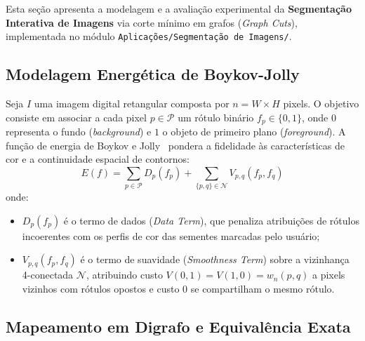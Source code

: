 \documentclass[12pt,a4paper]{article}
\begin{document}
Esta seção apresenta a modelagem e a avaliação experimental da \textbf{Segmentação Interativa de Imagens} via corte mínimo em grafos (\textit{Graph Cuts}), implementada no módulo \texttt{Aplicações/Segmentação de Imagens/}.

\subsection{Modelagem Energética de Boykov-Jolly}

Seja $I$ uma imagem digital retangular composta por $n = W \times H$ pixels. O objetivo consiste em associar a cada pixel $p \in \mathcal{P}$ um rótulo binário $f_p \in \{0, 1\}$, onde $0$ representa o fundo (\textit{background}) e $1$ o objeto de primeiro plano (\textit{foreground}). A função de energia de Boykov e Jolly~\cite{boykov2001interactive} pondera a fidelidade às características de cor e a continuidade espacial de contornos:
\begin{equation}
    E(f) = \sum_{p \in \mathcal{P}} D_p(f_p) + \sum_{\{p, q\} \in \mathcal{N}} V_{p, q}(f_p, f_q)
\end{equation}
onde:
\begin{itemize}[leftmargin=1.5em, itemsep=0.15em, topsep=0.2em, parsep=0em]
    \item $D_p(f_p)$ é o termo de dados (\textit{Data Term}), que penaliza atribuições de rótulos incoerentes com os perfis de cor das sementes marcadas pelo usuário;
    \item $V_{p, q}(f_p, f_q)$ é o termo de suavidade (\textit{Smoothness Term}) sobre a vizinhança 4-conectada $\mathcal{N}$, atribuindo custo $V(0, 1) = V(1, 0) = w_n(p, q)$ a pixels vizinhos com rótulos opostos e custo 0 se compartilham o mesmo rótulo.
\end{itemize}

\subsection{Mapeamento em Digrafo e Equivalência Exata}
\end{document}
